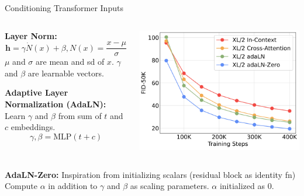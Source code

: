 \documentclass{beamer}
\begin{document}
\begin{frame}[t]{Conditioning Transformer Inputs}
    \vspace{-1em}
	\begin{columns}[t]
		\begin{column}{.5\textwidth}
            \textbf{Layer Norm:}
            \[\textbf{h} = \gamma \dot N(x) + \beta, N(x) = \frac{x - \mu}{\sigma}\]
            $\mu$ and $\sigma$ are mean and sd of $x$. $\gamma$ and $\beta$ are learnable vectors.

            \textbf{Adaptive Layer Normalization (AdaLN):} \newline
            Learn $\gamma$ and $\beta$ from sum of $t$ and $c$ embeddings.
            \[\gamma, \beta = \text{MLP}(t + c)\]
		\end{column}
		\begin{column}{.5\textwidth}
            \begin{center}
                \includegraphics[width=1.0\textwidth]{./img/diff_arch_norm.png}
            \end{center}
		\end{column}
	\end{columns}
    \vspace{1em}


    
    \textbf{AdaLN-Zero:}
    Inspiration from initializing scalars (residual block as identity fn)
    \newline
    Compute $\alpha$ in addition to $\gamma$ and $\beta$ as scaling parameters.\newline
    $\alpha$ initialized as 0.
\end{frame}
\end{document}

